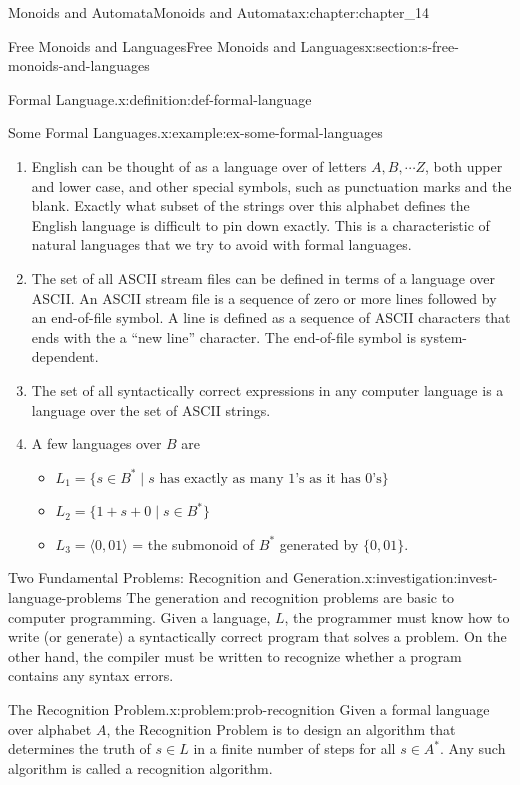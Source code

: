 \documentclass[twoside,10pt,]{book}
\numberwithin{equation}{section}
\begin{document}
\begin{chapterptx}{Monoids and Automata}{}{Monoids and Automata}{}{}{x:chapter:chapter_14}
\begin{sectionptx}{Free Monoids and Languages}{}{Free Monoids and Languages}{}{}{x:section:s-free-monoids-and-languages}
\begin{definition}{Formal Language.}{x:definition:def-formal-language}
\end{definition}
\begin{example}{Some Formal Languages.}{x:example:ex-some-formal-languages}%
%
\begin{enumerate}[label=(\alph*)]
\item{}English can be thought of as a language over of letters \(A,B,\cdots Z\), both upper and lower case,	and other special symbols, such as punctuation marks and the blank. Exactly what subset of the strings over this alphabet defines the English language is difficult to pin down exactly. This is a characteristic of natural languages that we try to avoid with formal languages.%
\item{}The set of all ASCII stream files can be defined in terms of a language over ASCII. An ASCII stream file is a sequence of zero or more lines followed by an end-of-file symbol. A line is defined as a sequence of ASCII characters that ends with the a ``new line'' character. The end-of-file symbol is system-dependent.%
\item{}The set of all syntactically correct expressions in any computer language is a language over the set of ASCII strings.%
\item{}A few languages over \(B\) are%
\begin{itemize}[label=\textbullet]
\item{}\(L_1=\{s\in B^* \mid s \textrm{  has  exactly  as many 1's as it  has 0's}\}\)%
\item{}\(L_2=\{1+s+0 \mid s\in B^*\}\)%
\item{}\(L_3=\langle 0,01\rangle\) = the submonoid of \(B^*\) generated by \(\{0,01\}\).%
\end{itemize}
%
\end{enumerate}
%
\end{example}
\begin{investigation}{Two Fundamental Problems: Recognition and Generation.}{x:investigation:invest-language-problems}%
The generation and recognition problems are basic to computer programming. Given a language, \(L\), the programmer must know how to write (or generate) a syntactically correct program that solves a problem. On the other hand, the compiler must be written to recognize whether a program contains any syntax errors.%
\end{investigation}
\begin{problem}{The Recognition Problem.}{x:problem:prob-recognition}%
Given a formal language over alphabet \(A\), the Recognition Problem is to design an algorithm that determines the truth of \(s\in L\) in a finite number of steps for all \(s\in A^*\). Any such algorithm is called a recognition algorithm.%

\end{problem}
\end{sectionptx}
\end{chapterptx}
\end{document}
